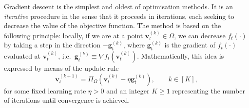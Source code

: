 \begin{mccorrection}
Gradient descent is the simplest and oldest of optimisation methods. It is an \emph{iterative} procedure in the sense that it proceeds in iterations, each seeking to decrease the value of the objective function. The method is based on the following principle: locally, if we are at a point $\mathbf{v}_{t}^{(k)} \in \Omega$, we can decrease $f_t(\cdot)$ by taking a step in the direction $-\mathbf{g}_t^{(k)}$, where $\mathbf{g}_t^{(k)}$ is the gradient of $f_t(\cdot)$ evaluated at $\mathbf{v}_{t}^{(k)}$, i.e.\ $\mathbf{g}_t^{(k)} \equiv \nabla f_t(\mathbf{v}_{t}^{(k)})$. Mathematically, this idea is expressed by means of the update rule
\begin{equation}
	\mathbf{v}_{t}^{(k+1)}
	= \Pi_{\Omega}(\mathbf{v}_{t}^{(k)} - \eta\mathbf{g}_t^{(k)}),
	\qquad k \in [K],
\end{equation}
for some fixed learning rate $\eta > 0$ and an integer $K \geq 1$ representing the number of iterations until convergence is achieved.
\end{mccorrection}

